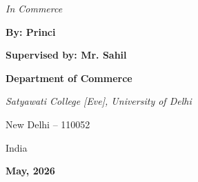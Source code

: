 \begin{titlepage}
    \textit{In Commerce}

    \vspace{2.0cm}

    \textbf{By: Princi}

    \vspace{0.5cm}

    \textbf{Supervised by: Mr. Sahil}

    \vspace{1.5cm}

    {\large \textbf{Department of Commerce}}

    \vspace{0.3cm}

    \textit{Satyawati College [Eve], University of Delhi}

    \vspace{0.3cm}

    New Delhi -- 110052

    India

    \vspace{0.5cm}

    \textbf{May, 2026} %

\end{titlepage}
